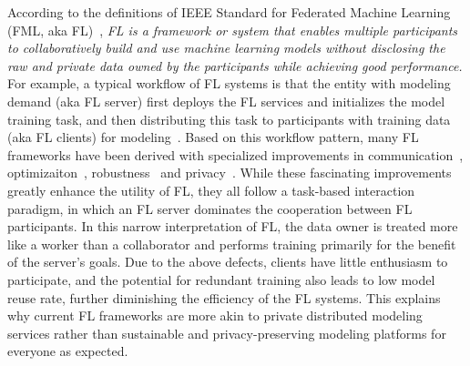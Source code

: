 According to the definitions of IEEE Standard for Federated Machine Learning (FML, aka FL)~\cite{IEEEstd3652}, \textit{FL is a framework or system that enables multiple participants to collaboratively build and use machine learning models without disclosing the raw and private data owned by the participants while achieving good performance.}
For example, a typical workflow of FL systems is that the entity with modeling demand (aka FL server) first deploys the FL services and initializes the model training task, and then distributing this task to participants with training data (aka FL clients) for modeling~\cite{bonawitz2019towards}.
Based on this workflow pattern, many FL frameworks have been derived with specialized improvements in communication~\cite{konevcny2016federated, mcmahan2017communication, xu2021asynchronous}, optimizaiton~\cite{li2018federated, karimireddy2020scaffold, li2021model}, robustness~\cite{duan2020self, sattler2019robust, li2022federated} and privacy~\cite{bonawitz2017practical, geyer2017differentially, cheng2021secureboost}.
While these fascinating improvements greatly enhance the utility of FL, they all follow a task-based interaction paradigm, in which an FL server dominates the cooperation between FL participants.
In this narrow interpretation of FL, the data owner is treated more like a worker than a collaborator and performs training primarily for the benefit of the server's goals.
Due to the above defects, clients have little enthusiasm to participate, and the potential for redundant training also leads to low model reuse rate, further diminishing the efficiency of the FL systems.
This explains why current FL frameworks are more akin to private distributed modeling services rather than sustainable and privacy-preserving modeling platforms for everyone as expected.

